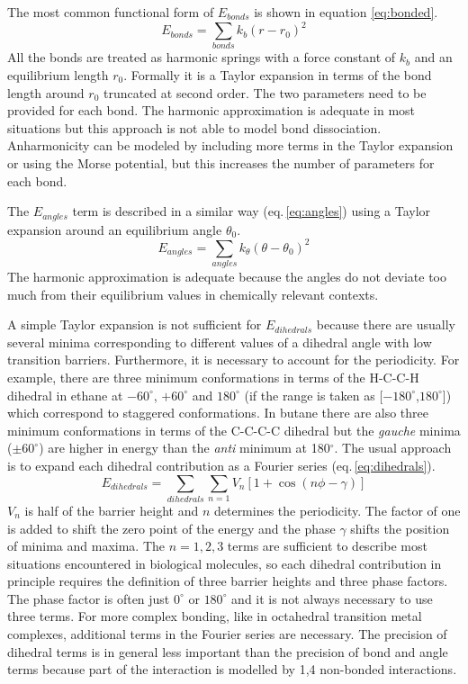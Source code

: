 The most common functional form of $E_{bonds}$ is shown in equation \ref{eq:bonded}.
\begin{equation} \label{eq:bonded}
    E_{bonds} = \sum_{bonds} k_b \left( r-r_{0} \right)^2
\end{equation}
All the bonds are treated as harmonic springs with a force constant of $k_b$ and an equilibrium length $r_0$. Formally it is a Taylor expansion in terms of the bond length around $r_0$ truncated at second order. The two parameters need to be provided for each bond. The harmonic approximation is adequate in most situations but this approach is not able to model bond dissociation. Anharmonicity can be modeled by including more terms in the Taylor expansion or using the Morse potential, but this increases the number of parameters for each bond.

The $E_{angles}$ term is described in a similar way (eq.\,\ref{eq:angles}) using a Taylor expansion around an equilibrium angle $\theta_0$.
\begin{equation} \label{eq:angles}
    E_{angles} = \sum_{angles} k_{\theta} \left( \theta-\theta_0 \right)^2
\end{equation}
The harmonic approximation is adequate because the angles do not deviate too much from their equilibrium values in chemically relevant contexts.

A simple Taylor expansion is not sufficient for $E_{dihedrals}$ because there are usually several minima corresponding to different values of a dihedral angle with low transition barriers. Furthermore, it is necessary to account for the periodicity. For example, there are three minimum conformations in terms of the H-C-C-H dihedral in ethane at $-60^{\circ}$, $+60^{\circ}$ and $180^{\circ}$ (if the range is taken as [$-180^{\circ}$,$180^{\circ}$]) which correspond to staggered conformations. In butane there are also three minimum conformations in terms of the C-C-C-C dihedral but the \textit{gauche} minima ($\pm 60^{\circ}$) are higher in energy than the \textit{anti} minimum at 180$^{\circ}$. The usual approach is to expand each dihedral contribution as a Fourier series (eq.\,\ref{eq:dihedrals}).
\begin{equation} \label{eq:dihedrals}
    E_{dihedrals} = \sum_{dihedrals} \sum_{n=1} V_n \left[ 1 + \cos(n\phi - \gamma) \right] 
\end{equation}
$V_n$ is half of the barrier height and $n$ determines the periodicity. The factor of one is added to shift the zero point of the energy and the phase $\gamma$ shifts the position of minima and maxima. The $n=1,2,3$ terms are sufficient to describe most situations encountered in biological molecules, so each dihedral contribution in principle requires the definition of three barrier heights and three phase factors. The phase factor is often just $0^{\circ}$ or $180^{\circ}$ and it is not always necessary to use three terms. For more complex bonding, like in octahedral transition metal complexes, additional terms in the Fourier series are necessary. The precision of dihedral terms is in general less important than the precision of bond and angle terms because part of the interaction is modelled by 1,4 non-bonded interactions.


